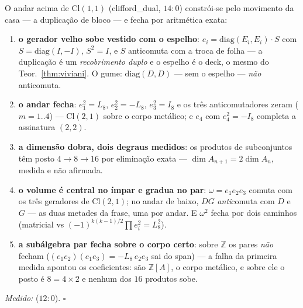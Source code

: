\documentclass[livro.tex]{subfiles}
\begin{document}
\begin{teorema}\label{thm:clifford-pleno}
O andar acima de $\mathrm{Cl}(1,1)$ (clifford\_dual, $14{:}0$)
constr\'oi-se pelo movimento da casa --- a duplica\c{c}\~ao de bloco
--- e fecha por aritm\'etica exata:
\begin{enumerate}
\item \textbf{o gerador velho sobe vestido com o espelho}:
$e_{i}=\mathrm{diag}(E_{i},E_{i})\cdot S$ com $S=\mathrm{diag}(I,-I)$,
$S^{2}=I$, e $S$ anticomuta com a troca de folha --- a duplica\c{c}\~ao
\'e um \emph{recobrimento duplo} e o espelho \'e o deck, o mesmo do
Teor.~\ref{thm:viviani}. O gume: $\mathrm{diag}(D,D)$ --- sem o
espelho --- \emph{n\~ao} anticomuta.
\item \textbf{o andar fecha}: $e_{1}^{2}=L_{8}$, $e_{2}^{2}=-L_{8}$,
$e_{3}^{2}=I_{8}$ e os tr\^es anticomutadores zeram ($m=1..4$) ---
$\mathrm{Cl}(2,1)$ sobre o corpo met\'alico; e $e_{4}$ com
$e_{4}^{2}=-I_{8}$ completa a assinatura $(2,2)$.
\item \textbf{a dimens\~ao dobra, dois degraus medidos}: os produtos
de subconjuntos t\^em posto $4\to8\to16$ por elimina\c{c}\~ao exata
--- $\dim A_{n+1}=2\dim A_{n}$, medida e n\~ao afirmada.
\item \textbf{o volume \'e central no \'impar e gradua no par}:
$\omega=e_{1}e_{2}e_{3}$ comuta com os tr\^es geradores de
$\mathrm{Cl}(2,1)$; no andar de baixo, $DG$ \emph{anti}comuta com $D$
e $G$ --- as duas metades da frase, uma por andar. E $\omega^{2}$
fecha por dois caminhos (matricial vs
$(-1)^{k(k-1)/2}\prod e_{i}^{2}=L_{8}^{2}$).
\item \textbf{a subálgebra par fecha sobre o corpo certo}: sobre
$\mathbb{Z}$ os pares \emph{n\~ao} fecham
($(e_{1}e_{2})(e_{1}e_{3})=-L_{8}\,e_{2}e_{3}$ sai do span) --- a
falha da primeira medida apontou os coeficientes: s\~ao
$\mathbb{Z}[A]$, o corpo met\'alico, e sobre ele o posto \'e
$8=4\times2$ e nenhum dos $16$ produtos sobe.
\end{enumerate}
\emph{Medido:}  ($12{:}0$).
$\square$
\end{teorema}
\end{document}
